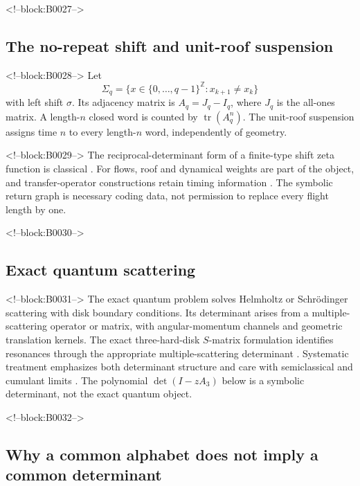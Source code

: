 \documentclass[11pt,a4paper]{article}
\theoremstyle{definition}
\theoremstyle{remark}
\newcommand{\tr}{\operatorname{tr}}
\begin{document}
<!--block:B0027-->
\subsection{The no-repeat shift and unit-roof suspension}

<!--block:B0028-->
Let
\[
 \Sigma_q=\{x\in\{0,\ldots,q-1\}^{\mathbb Z}:x_{k+1}\ne x_k\}
\]
with left shift \(\sigma\). Its adjacency matrix is \(A_q=J_q-I_q\), where \(J_q\) is the all-ones matrix. A length-\(n\) closed word is counted by \(\tr(A_q^n)\). The unit-roof suspension assigns time \(n\) to every length-\(n\) word, independently of geometry.

<!--block:B0029-->
The reciprocal-determinant form of a finite-type shift zeta function is classical \citep[pp.~43--49]{BowenLanford1970}.
For flows, roof and dynamical weights are part of the object, and transfer-operator constructions retain timing information \citep[Secs.~1--3]{Ruelle1976}. The symbolic return graph is necessary coding data, not permission to replace every flight length by one.

<!--block:B0030-->
\subsection{Exact quantum scattering}

<!--block:B0031-->
The exact quantum problem solves Helmholtz or Schrödinger scattering with disk boundary conditions. Its determinant arises from a multiple-scattering operator or matrix, with angular-momentum channels and geometric translation kernels.
The exact three-hard-disk \(S\)-matrix formulation identifies resonances through the appropriate multiple-scattering determinant \citep[abstract and Secs.~II--III]{GaspardRice1989Exact}.
Systematic treatment emphasizes both determinant structure and care with semiclassical and cumulant limits \citep[Secs.~4--6]{Wirzba1999}. The polynomial \(\det(I-zA_3)\) below is a symbolic determinant, not the exact quantum object.

<!--block:B0032-->
\subsection{Why a common alphabet does not imply a common determinant}
\end{document}
